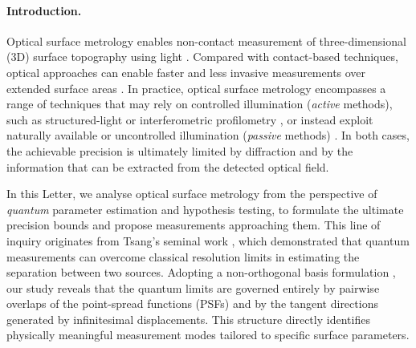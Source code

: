 \documentclass[reprint,amsmath,amssymb,aps,prl,floatfix,groupedaddress,superscriptaddress]{revtex4-2}
\begin{document}
\maketitle


\paragraph{\bfseries Introduction.\label{sec:intro}}
Optical surface metrology enables non-contact measurement of three-dimensional (3D) surface topography using light \cite{leach2020advances,catalucci2022optical}. Compared with contact-based techniques, optical approaches can enable faster and less invasive measurements over extended surface areas \cite{hocken2005optical}. In practice, optical surface metrology encompasses a range of techniques that may rely on controlled illumination ({\em active} methods), such as structured-light or interferometric profilometry \cite{yang2022single,van2019deep,wang2021single,li2016single}, or instead exploit naturally available or uncontrolled illumination ({\em passive} methods) \cite{mathia2011recent,marrugo2020state}. In both cases, the achievable precision is ultimately limited by diffraction and by the information that can be extracted from the detected optical field.


In this Letter, we analyse optical surface metrology from the perspective of {\em quantum} parameter estimation and hypothesis testing, to formulate the ultimate precision bounds and propose measurements approaching them. This line of inquiry originates from Tsang's seminal work \cite{tsang2016quantum}, which demonstrated that quantum measurements can overcome classical resolution limits in estimating the separation between two sources.
Adopting a non-orthogonal basis formulation \cite{fiderer2021general,napoli2019towards,genoni2019non}, our study reveals that the quantum limits are governed entirely by pairwise overlaps of the  point-spread functions (PSFs) and by the tangent directions generated by infinitesimal displacements. This structure directly identifies physically meaningful measurement modes tailored to specific surface parameters.
\end{document}
